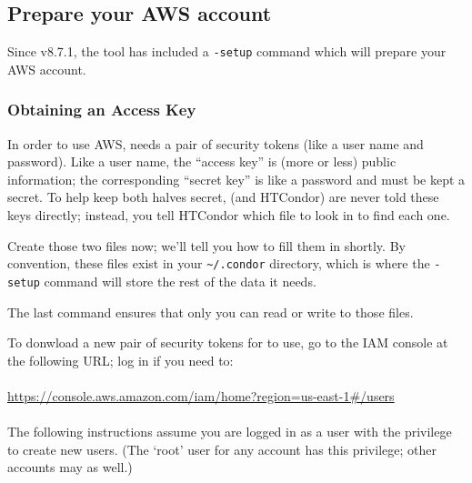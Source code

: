 
\subsection{Prepare your AWS account}

Since v8.7.1, the  tool has included a \texttt{-setup} command which will
prepare your AWS account.

\subsubsection{Obtaining an Access Key}

In order to use AWS,  needs a pair of security tokens (like a
user name and password).  Like a user name, the ``access key'' is (more or
less) public information; the corresponding ``secret key'' is like a password
and must be kept a secret.  To help keep both halves secret,
 (and HTCondor) are never told these keys directly; instead, you
tell HTCondor which file to look in to find each one.

Create those two files now; we'll tell you how to fill them in shortly.  By
convention, these files exist in your \texttt{\textasciitilde{}/.condor}
directory, which is where the \texttt{-setup} command will store the rest of
the data it needs.


The last command ensures that only you can read or write to those files.

To donwload a new pair of security tokens for  to use, go to
the IAM console at the following URL; log in if you need to:\\
\\
\url{https://console.aws.amazon.com/iam/home?region=us-east-1#/users}\\
\\
The following instructions assume you are logged in as a user
with the privilege to create new users.  (The `root' user for any account has
this privilege; other accounts may as well.)

